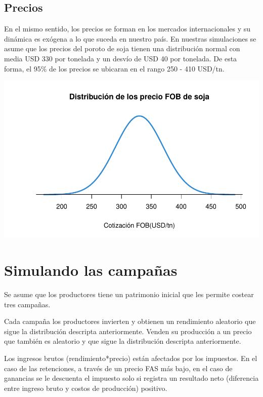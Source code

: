 \documentclass[
  12pt,
  spanish,
  10pt]{article}
\begin{document}
\hypertarget{precios}{%
\subsection{Precios}\label{precios}}

En el mismo sentido, los precios se forman en los mercados
internacionales y su dinámica es exógena a lo que suceda en nuestro
país. En nuestras simulaciones se asume que los precios del poroto de
soja tienen una distribución normal con media USD 330 por tonelada y un
desvío de USD 40 por tonelada. De esta forma, el 95\% de los precios se
ubicaran en el rango 250 - 410 USD/tn.

\begin{center}\includegraphics{simulacion_retenciones_bagging_files/figure-latex/unnamed-chunk-4-1} \end{center}

\hypertarget{simulando-las-campauxf1as}{%
\section{Simulando las campañas}\label{simulando-las-campauxf1as}}

Se asume que los productores tiene un patrimonio inicial que les permite
costear tres campañas.

Cada campaña los productores invierten y obtienen un rendimiento
aleatorio que sigue la distribución descripta anteriormente. Venden su
producción a un precio que también es aleatorio y que sigue la
distribución descripta anteriormente.

Los ingresos brutos (rendimiento*precio) están afectados por los
impuestos. En el caso de las retenciones, a través de un precio FAS más
bajo, en el caso de ganancias se le descuenta el impuesto solo si
registra un resultado neto (diferencia entre ingreso bruto y costos de
producción) positivo.
\end{document}
